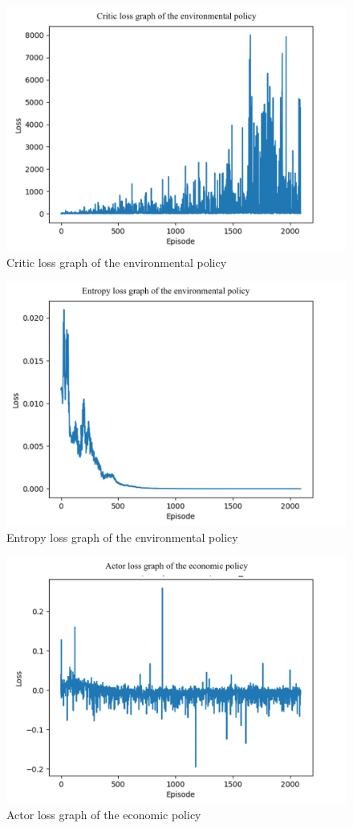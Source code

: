 \documentclass[preprint,12pt]{elsarticle}
\begin{document}
\begin{figure}[h!]
    \centering
    \includegraphics[width=0.7\linewidth]{paper/doc/result_figure/AFMORL_env_cri_loss_v1.jpg}
    \caption{Critic loss graph of the environmental policy}
    
    \label{fig:enter-label}
\end{figure}

\begin{figure}[h!]
    \centering
    \includegraphics[width=0.7\linewidth]{paper/doc/result_figure/AFMORL_env_entr_loss_v1.jpg}
    \caption{Entropy loss graph of the environmental policy}
    
    \label{fig:enter-label}
\end{figure}

\begin{figure}[h!]
    \centering
    \includegraphics[width=0.7\linewidth]{paper/doc/result_figure/AFMORL_eco_ac_loss_v1.jpg}
    \caption{Actor loss graph of the economic policy}
    
    \label{fig:enter-label}
\end{figure}
\end{document}
